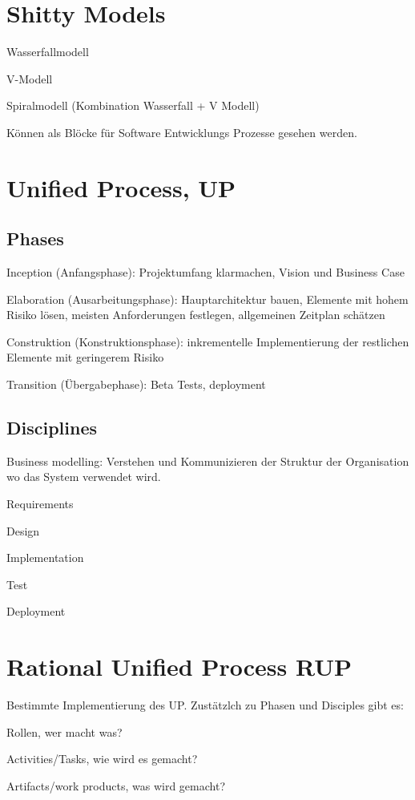 \section{Shitty Models}
\begin{compactitem}
    \item Wasserfallmodell
    \item V-Modell
    \item Spiralmodell (Kombination Wasserfall + V Modell)
\end{compactitem}
Können als Blöcke für Software Entwicklungs Prozesse gesehen werden.

\section{Unified Process, UP}
\subsection{Phases}
\begin{compactitem}
    \item Inception (Anfangsphase): Projektumfang klarmachen, Vision und Business
    Case
    \item Elaboration (Ausarbeitungsphase): Hauptarchitektur bauen, Elemente mit
    hohem Risiko lösen, meisten Anforderungen festlegen, allgemeinen Zeitplan
    schätzen
    \item Construktion (Konstruktionsphase): inkrementelle Implementierung der
    restlichen Elemente mit geringerem Risiko
    \item Transition (Übergabephase): Beta Tests, deployment
\end{compactitem}
\subsection{Disciplines}
\begin{compactitem}
    \item Business modelling: Verstehen und Kommunizieren der Struktur der Organisation
    wo das System verwendet wird.
    \item Requirements
    \item Design
    \item Implementation
    \item Test
    \item Deployment
\end{compactitem}
\section{Rational Unified Process RUP}
Bestimmte Implementierung des UP. Zustätzlch zu Phasen und Disciples gibt es:
\begin{compactitem}
    \item Rollen, wer macht was?
    \item Activities/Tasks, wie wird es gemacht?
    \item Artifacts/work products, was wird gemacht?
\end{compactitem}

